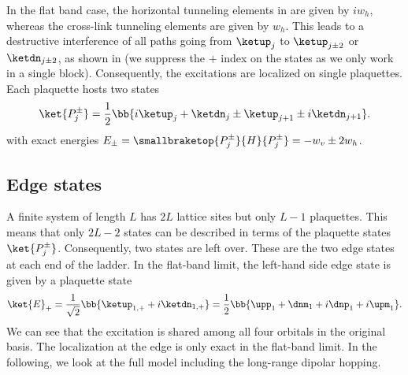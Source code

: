 In the flat band case, the horizontal tunneling elements in  are given by $i w_h$, whereas the cross-link tunneling elements are given by $w_h$.
This leads to a destructive interference of all paths going from $\ketup_j$ to $\ketup_{j \pm 2}$ or $\ketdn_{j\pm 2}$, as shown in  (we suppress the $+$ index on the states as we only work in a single block).
Consequently, the excitations are localized on single plaquettes. Each plaquette hosts two states
\begin{align}
    \ket{P_j^\pm} = \frac{1}{2} \bb{ i \ketup_j + \ketdn_j \pm \ketup_{j+1} \pm i \ketdn_{j+1} }.
\end{align}
with exact energies $E_\pm=\smallbraketop{P_j^\pm}{H}{P_j^\pm}=-w_v \pm 2 w_h$.



\subsection{Edge states}
A finite system of length $L$ has $2L$ lattice sites but only $L-1$ plaquettes. This means that only $2L - 2$ states can be described in terms of the plaquette states $\ket{P_j^\pm}$.
Consequently, two states are left over.
These are the two edge states at each end of the ladder. In the flat-band limit, the left-hand side edge state is given by  a plaquette state
\begin{align}
    \ket{E}_+ = \frac{1}{\sqrt{2}} \bb{ \ketup_{1,+} + i \ketdn_{1,+} } = \frac{1}{2} \bb{ \upp_1 + \dnm_1 + i\dnp_1 + i\upm_1 }.
\end{align}
We can see that the excitation is shared among all four orbitals in the original basis.
The localization at the edge is only exact in the flat-band limit.
In the following, we look at the full model including the long-range dipolar hopping.


